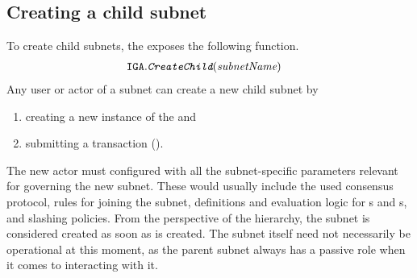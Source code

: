 \subsection{Creating a child subnet}
\label{sec:create}

To create child subnets, the \gw exposes the following function.
\begin{align*}
    \texttt{IGA}.&\textit{\texttt{CreateChild}}(\textit{subnetName})
\end{align*}
Any user or actor of a subnet  can create a new child subnet  by
\begin{enumerate}
    \item creating a new instance of the \saFull {} and
    \item submitting a transaction ().
\end{enumerate}

The new actor  must configured with all the subnet-specific parameters relevant for governing the new subnet.
These would usually include the used consensus protocol, rules for joining the subnet, definitions and evaluation logic for {\pom}s and {\pof}s, and slashing policies.
From the perspective of the \ipc hierarchy, the subnet is considered created as soon as  is created.
The subnet itself need not necessarily be operational at this moment,
as the parent subnet always has a passive role when it comes to interacting with it.

